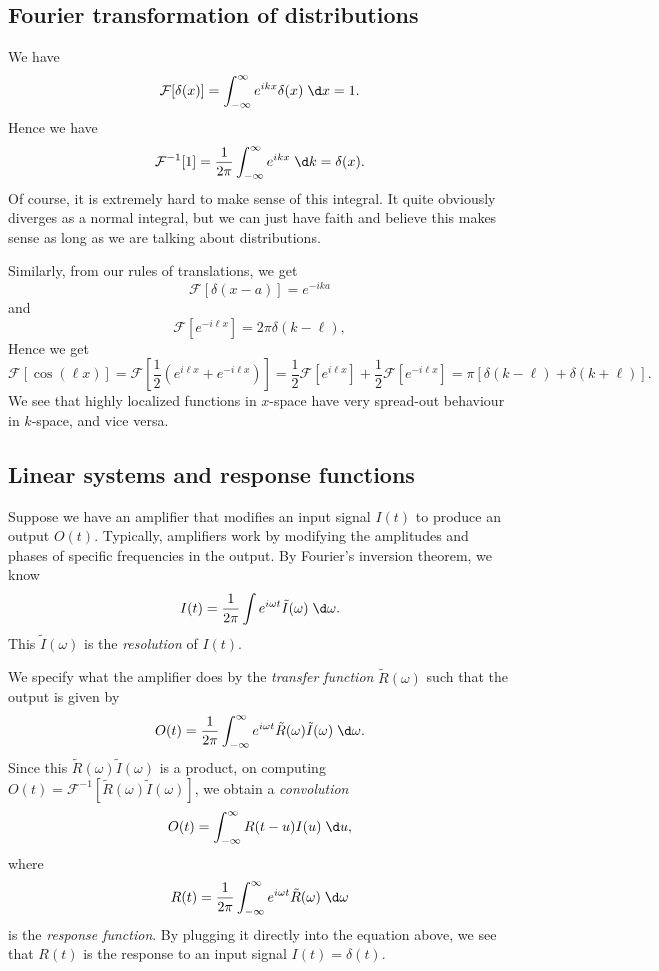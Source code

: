 \documentclass[a4paper]{article}
\begin{document}
\subsection{Fourier transformation of distributions}
We have
\[
  \mathcal{F}[\delta(x)] = \int_{-\infty}^\infty e^{ikx} \delta (x)\;\d x = 1.
\]
Hence we have
\[
  \mathcal{F}^{-1}[1] = \frac{1}{2\pi} \int_{-\infty}^\infty e^{ikx}\;\d k = \delta (x).
\]
Of course, it is extremely hard to make sense of this integral. It quite obviously diverges as a normal integral, but we can just have faith and believe this makes sense as long as we are talking about distributions.

Similarly, from our rules of translations, we get
\[
  \mathcal{F}[\delta(x - a)] = e^{-ika}
\]
and
\[
  \mathcal{F}[e^{-i\ell x}] = 2\pi \delta(k - \ell),
\]
Hence we get
\[
  \mathcal{F}[\cos (\ell x)] = \mathcal{F}\left[\frac{1}{2}( e^{i\ell x} + e^{-i\ell x})\right] = \frac{1}{2} \mathcal{F}[e^{i\ell x}] + \frac{1}{2} \mathcal{F}[e^{-i\ell x}] = \pi [\delta (k - \ell) + \delta(k + \ell)].
\]
We see that highly localized functions in $x$-space have very spread-out behaviour in $k$-space, and vice versa.

\subsection{Linear systems and response functions}
Suppose we have an amplifier that modifies an input signal $I(t)$ to produce an output $O(t)$. Typically, amplifiers work by modifying the amplitudes and phases of specific frequencies in the output. By Fourier's inversion theorem, we know
\[
  I(t) = \frac{1}{2\pi} \int e^{i\omega t} \tilde{I}(\omega) \;\d \omega.
\]
This $\tilde{I}(\omega)$ is the \emph{resolution} of $I(t)$.

We specify what the amplifier does by the \emph{transfer function} $\tilde{R}(\omega)$ such that the output is given by
\[
  O(t) = \frac{1}{2\pi} \int_{-\infty}^\infty e^{i\omega t} \tilde{R}(\omega) \tilde{I}(\omega)\;\d \omega.
\]
Since this $\tilde{R}(\omega) \tilde{I}(\omega)$ is a product, on computing $O(t) = \mathcal{F}^{-1}[\tilde{R}(\omega) \tilde{I}(\omega)]$, we obtain a \emph{convolution}
\[
  O(t) = \int_{-\infty}^\infty R(t - u) I(u)\;\d u,
\]
where
\[
  R(t) = \frac{1}{2\pi} \int_{-\infty}^\infty e^{i\omega t} \tilde{R}(\omega) \;\d \omega
\]
is the \emph{response function}. By plugging it directly into the equation above, we see that $R(t)$ is the response to an input signal $I(t) = \delta(t)$.
\end{document}
